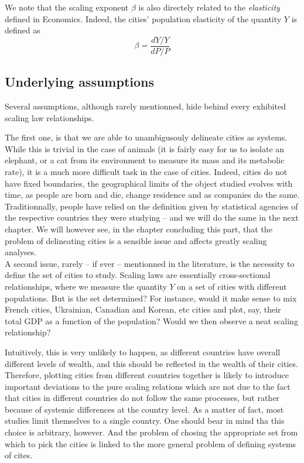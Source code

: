 We note that the scaling exponent $\beta$ is also directely related to the \emph{elasticity}
defined in Economics. Indeed, the cities' population elasticity of the quantity
$Y$ is defined as\\

\begin{equation}
    \beta = \frac{dY/Y}{dP/P}
\end{equation}


\subsection{Underlying assumptions}
\label{sub:underlying_asumptions}


Several assumptions, although rarely mentionned, hide behind every exhibited
scaling law relationships.

The first one, is that we are able to unambigusouly delineate cities as systems.
While this is trivial in the case of animals (it is fairly easy for us to
isolate an elephant, or a cat from its environment to measure its mass and its
metabolic rate), it is a much more difficult task in the case of cities.
Indeed, cities do not have fixed boundaries, the geographical limits of the
object studied evolves with time, as people are born and die, change residence
and as companies do the same.  Traditionnally, people have relied on the
definition given by statistical agencies of the respective countries they were
studying -- and we will do the same in the next chapter. We will however see, in
the chapter concluding this part, that the problem of delineating cities is a
sensible issue and affects greatly scaling analyses. \\


A second issue, rarely -- if ever -- mentionned in the literature, is the
necessity to define the set of cities to study. Scaling laws are essentially
cross-sectional relationships, where we measure the quantity $Y$ on a set of
cities with different populations. But is the set determined? For instance,
would it make sense to mix French cities, Ukrainian, Canadian and Korean, etc
cities and plot, say, their total GDP as a function of the population? Would we
then observe a neat scaling relationship? 

Intuitively, this is very unlikely to happen, as different countries have
overall different levels of wealth, and this should be reflected in the wealth
of their cities. Therefore, plotting cities from different countries together is
likely to introduce important deviations to the pure scaling relations which are
not due to the fact that cities in different countries do not follow the same
processes, but rather because of systemic differences at the country level. As a
matter of fact, most studies limit themselves to a single country. One should
bear in mind tha this choice is arbitrary, however. And the problem of chosing
the appropriate set from which to pick the cities is linked to the more general
problem of defining systems of cites.


